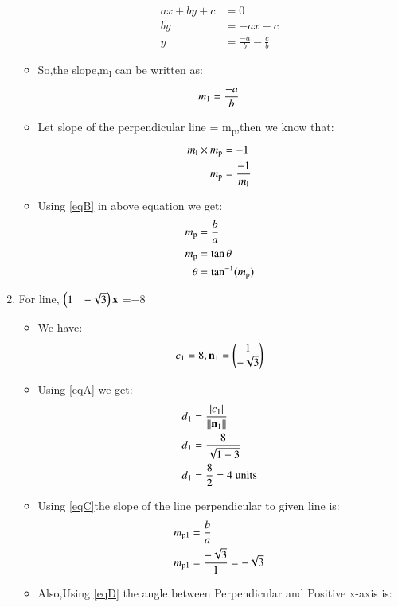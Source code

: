 \documentclass[journal,12pt,twocolumn]{IEEEtran}
\begin{document}
\begin{enumerate}
\begin{itemize}
\begin{align}
    ax+by+c&=0
    \\
    by&=-ax-c
    \\
    y&=\frac{-a}{b}-\frac{c}{b}
    \end{align}
\item So,the slope,m\textsubscript{l} can be written as:
\begin{align}
 m\textsubscript{1}=\frac{-a}{b} \label{eqB}
 \end{align}
\item Let slope of the perpendicular line = m\textsubscript{p},then we know that:
\begin{align}
     m\textsubscript{l}\times m\textsubscript{p}&=-1
     \\
     m\textsubscript{p}&=\frac{-1}{m\textsubscript{l}}
\end{align}
\item Using \eqref{eqB} in above equation we get:
\begin{align}
     m\textsubscript{p}&=\frac{b}{a} \label{eqC}
     \\
  m\textsubscript{p}&=\tan \theta
  \\
  \theta &= \tan^{-1}( m\textsubscript{p})\label{eqD}
\end{align}
\end{itemize}
\item For line, $\begin{pmatrix}1&-\sqrt{3}\end{pmatrix}\mathbf{x}$ =$-8$
\begin{itemize}
\item We have:
\begin{align}
 c\textsubscript{1}=8 , {\mathbf{n\textsubscript{1}}}=\begin{pmatrix}1\\-\sqrt{3}\end{pmatrix}   
\end{align}
\item Using \eqref{eqA} we get:
\begin{align}
d\textsubscript{1}&=\frac { \left| c\textsubscript{1} \right| }{\lVert\mathbf{n\textsubscript{1}}\rVert}
\\
d\textsubscript{1}&=\frac{8}{\sqrt{1+3}} 
\\
d\textsubscript{1}&=\frac{8}{2}=4\text{ units}
\end{align}
\item Using \eqref{eqC}the slope of the line perpendicular to given line is:
\begin{align}
  m\textsubscript{p1}&=\frac{b}{a}
  \\
  m\textsubscript{p1}&=\frac{-\sqrt{3}}{1}=-\sqrt{3}
\end{align}
 \item Also,Using \eqref{eqD} the angle between Perpendicular and Positive x-axis is:

\end{itemize}
\end{enumerate}
\end{document}
